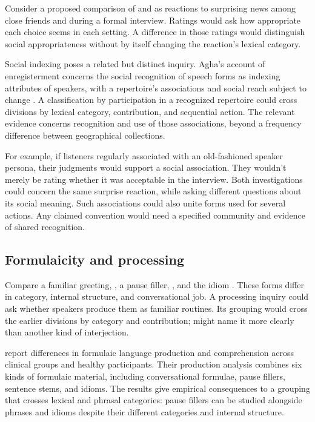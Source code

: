 \documentclass[12pt]{article}
\begin{document}
Consider a proposed comparison of  and 
as reactions to surprising news among close friends and during a
formal interview. Ratings would ask how appropriate each choice seems
in each setting. A difference in those ratings would distinguish
social appropriateness without by itself changing the reaction's
lexical category.

Social indexing poses a related but distinct inquiry. Agha's account
of enregisterment concerns the social recognition of speech forms as
indexing attributes of speakers, with a repertoire's associations and
social reach subject to change \citep[38--40]{agha2005}. A classification
by participation in a recognized repertoire could cross divisions by
lexical category, contribution, and sequential action. The relevant evidence concerns
recognition and use of those associations, beyond a frequency difference
between geographical collections.

For example, if listeners regularly associated  with an
old-fashioned speaker persona, their judgments would support a social
association. They wouldn't merely be rating whether it was acceptable
in the interview. Both investigations could concern the same surprise
reaction, while asking different questions about its social meaning.
Such associations could also unite forms used for several actions.
Any claimed convention would need a specified community and evidence
of shared recognition.

\subsection{Formulaicity and processing}

Compare a familiar greeting, , a pause filler,
, and the idiom . These forms differ
in category, internal structure, and conversational job. A processing inquiry
could ask whether speakers produce them as familiar routines.
Its grouping would cross the earlier divisions by category and contribution;
 might name it more clearly than another
kind of interjection.

\textcite{vanlanckersidtis2015} report differences in formulaic
language production and comprehension across clinical groups and
healthy participants. Their production
analysis combines six kinds of formulaic material, including conversational
formulae, pause fillers, sentence stems, and idioms. The results give
empirical consequences to a grouping that crosses lexical and phrasal
categories: pause fillers can be studied alongside phrases and idioms
despite their different categories and internal structure.
\end{document}
